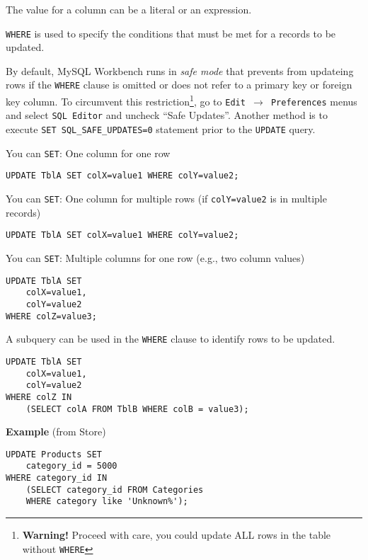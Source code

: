 \documentclass{article}
\begin{document}
   \begin{outline}

\1 The value for a column can be a literal or an expression.  
 

 \1 \texttt{WHERE} is used to specify the conditions that must be met for a records to be updated.  
 


 
\1 By default, MySQL Workbench runs in \textit{safe mode} that prevents from updateing rows if the \texttt{WHERE} clause is omitted or does not refer to a primary key or foreign key column.  To circumvent this restriction\footnote{\textbf{Warning!} Proceed with care, you could update ALL rows in the table without \texttt{WHERE}}, go to \texttt{Edit $\to$ Preferences} menus and select \texttt{SQL Editor} and uncheck ``Safe Updates''.  Another method is to execute \texttt{SET SQL\_SAFE\_UPDATES=0} statement prior to the \texttt{UPDATE} query.  %




 \1You can \texttt{SET}:   One column for one row	
	\1[]  
	\begin{lstlisting}[frame=none]  
UPDATE TblA SET colX=value1 WHERE colY=value2;
	\end{lstlisting} 





\1 You can \texttt{SET}:  One column for multiple rows (if \texttt{colY=value2} is in multiple records) 
	\1[]  
	\begin{lstlisting}[frame=none]  
UPDATE TblA SET colX=value1 WHERE colY=value2;
	\end{lstlisting} 
	



	
\1 You can \texttt{SET}:  Multiple columns for one row (e.g., two column values)
	
	\1[]  
	\begin{lstlisting}[frame=none]  
UPDATE TblA SET 
	colX=value1, 
	colY=value2 
WHERE colZ=value3;
	\end{lstlisting} 



 
 
 \1 A subquery can be used in the \texttt{WHERE} clause to identify rows to be updated. 
 \1[]  
	\begin{lstlisting}[frame=none]  
UPDATE TblA SET 
	colX=value1, 
	colY=value2 
WHERE colZ IN
	(SELECT colA FROM TblB WHERE colB = value3);
	\end{lstlisting} 

 \1[]  \textbf{Example} (from Store)
	\begin{lstlisting}[frame=none]  
UPDATE Products SET 
	category_id = 5000
WHERE category_id IN
	(SELECT category_id FROM Categories 
	WHERE category like 'Unknown%');
	\end{lstlisting} 


\end{outline}
\end{document}
